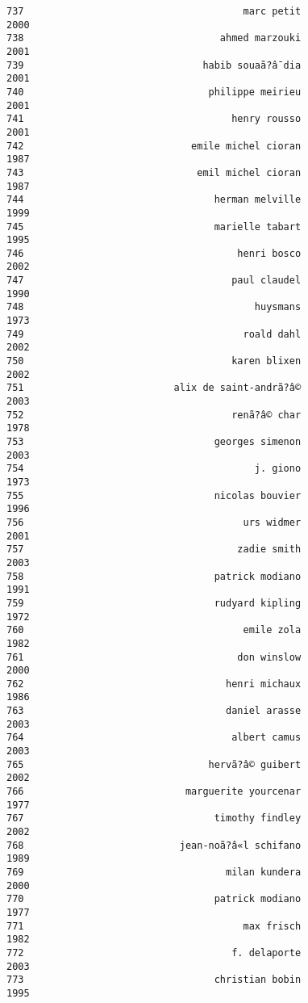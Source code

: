 \documentclass[
]{report}
\begin{document}
\begin{verbatim}
737                                      marc petit                2000
738                                  ahmed marzouki                2001
739                               habib souaã?â¯dia                2001
740                                philippe meirieu                2001
741                                    henry rousso                2001
742                             emile michel cioran                1987
743                              emil michel cioran                1987
744                                 herman melville                1999
745                                 marielle tabart                1995
746                                     henri bosco                2002
747                                    paul claudel                1990
748                                        huysmans                1973
749                                      roald dahl                2002
750                                    karen blixen                2002
751                          alix de saint-andrã?â©                2003
752                                    renã?â© char                1978
753                                 georges simenon                2003
754                                        j. giono                1973
755                                 nicolas bouvier                1996
756                                      urs widmer                2001
757                                     zadie smith                2003
758                                 patrick modiano                1991
759                                 rudyard kipling                1972
760                                      emile zola                1982
761                                     don winslow                2000
762                                   henri michaux                1986
763                                   daniel arasse                2003
764                                    albert camus                2003
765                                hervã?â© guibert                2002
766                            marguerite yourcenar                1977
767                                 timothy findley                2002
768                           jean-noã?â«l schifano                1989
769                                   milan kundera                2000
770                                 patrick modiano                1977
771                                      max frisch                1982
772                                    f. delaporte                2003
773                                 christian bobin                1995

\end{verbatim}
\end{document}
